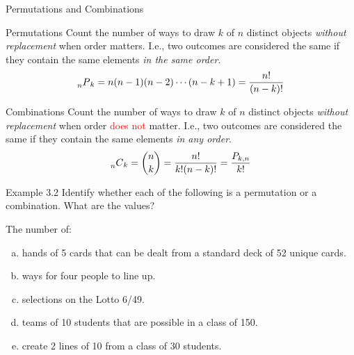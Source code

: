 \documentclass[aspectratio=169,xcolor=pdftex,dvipsnames,table]{beamer}\usepackage[]{graphicx}\usepackage[]{xcolor}
\begin{document}
\begin{frame}{Permutations and Combinations}
  \begin{block}{Permutations}
    Count the number of ways to draw $k$ of $n$ distinct objects \textit{without replacement} when order matters. I.e., two outcomes are considered the same if they contain the same elements \textit{in the same order}.
    \[
      \prescript{}{n}P_k=n(n-1)(n-2)\cdots(n-k+1)=\frac{n!}{(n-k)!}
    \]
  \end{block}

  \vspace{-.2in}
  
  \begin{block}{Combinations}
    Count the number of ways to draw $k$ of $n$ distinct objects \textit{without replacement} when order \textcolor{red}{does not} matter. I.e., two outcomes are considered the same if they contain the same elements \textit{in any order}.
    \[
      \prescript{}{n}C_k={n \choose k} =\frac{n!}{k!(n-k)!}=\frac{P_{k,n}}{k!}
    \]
  \end{block}
  
\end{frame}

\begin{frame}{Example 3.2}
  Identify whether each of the following is a permutation or a combination. What are the values?

  \medskip

  The number of:
  \begin{enumerate}[a)]
  \item hands of 5 cards that can be dealt from a standard deck of 52 unique cards.
  \item ways for four people to line up.
  \item selections on the Lotto 6/49.
  \item teams of 10 students that are possible in a class of 150.
  \item create 2 lines of 10 from a class of 30 students.
  \end{enumerate}
\end{frame}
\end{document}
